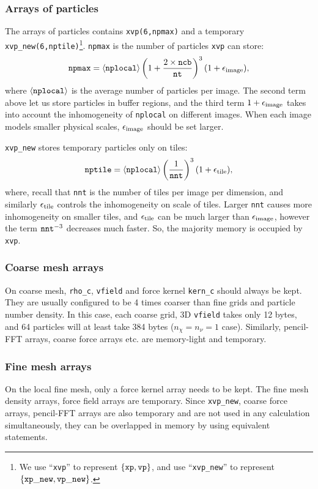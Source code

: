 \documentclass[10pt,twocolumn,preprint]{emulateapj}
\begin{document}
\subsubsection{Arrays of particles}
The arrays of particles contains {\tt xvp(6,npmax)} and a temporary {\tt xvp\_new(6,nptile)}\footnote{We use ``{\tt xvp}'' to represent $\{{\tt xp},{\tt vp}\}$, and use ``{\tt xvp\_new}'' to represent $\{{\tt xp\_new},{\tt vp\_new}\}$.}. {\tt npmax} is the number of particles {\tt xvp} can store:
\begin{equation}
	{\tt npmax}=\left\langle {\tt nplocal} \right\rangle \left( 1+\frac{2\times {\tt ncb}}{\tt nt} \right)^3(1+\epsilon_{\rm image}),
\end{equation}
where $\left\langle {\tt nplocal} \right\rangle$ is the average number of particles per image. The second term above let us store particles in buffer regions, and the third term $1+\epsilon_{\rm image}$ takes into account the inhomogeneity of {\tt nplocal} on different images. When each image models smaller physical scales, $\epsilon_{\rm image}$ should be set larger. 

{\tt xvp\_new} stores temporary particles only on tiles:
\begin{equation}
	{\tt nptile}=\left\langle {\tt nplocal} \right\rangle \left( \frac{1}{\tt nnt} \right)^3(1+\epsilon_{\rm tile}),
\end{equation}
where, recall that {\tt nnt} is the number of tiles per image per dimension, and similarly $\epsilon_{\rm tile}$ controls the inhomogeneity on scale of tiles. Larger {\tt nnt} causes more inhomogeneity on smaller tiles, and $\epsilon_{\rm tile}$ can be much larger than $\epsilon_{\rm image}$, however the term ${\tt nnt}^{-3}$ decreases much faster. So, the majority memory is occupied by {\tt xvp}.

\subsubsection{Coarse mesh arrays}
On coarse mesh, {\tt rho\_c}, {\tt vfield} and force kernel {\tt kern\_c} should always be kept. They are usually configured to be 4 times coarser than fine grids and particle number density. In this case, each coarse grid, 3D {\tt vfield} takes only 12 bytes, and 64 particles will at least take 384 bytes ($n_\chi=n_\nu=1$ case). Similarly, pencil-FFT arrays, coarse force arrays etc. are memory-light and temporary.

\subsubsection{Fine mesh arrays}
On the local fine mesh, only a force kernel array needs to be kept. The fine mesh density arrays, force field arrays are temporary. Since {\tt xvp\_new}, coarse force arrays, pencil-FFT arrays are also temporary and are not used in any calculation simultaneously, they can be overlapped in memory by using equivalent statements.
\end{document}
